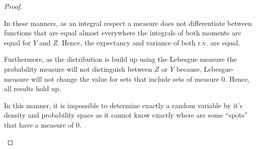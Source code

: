 \documentclass[11pt]{article}
\theoremstyle{definition}
\theoremstyle{remark}
\theoremstyle{remark}
\begin{document}
\begin{proof}
\begin{enumerate}[label=\alph*)]
      In these manners, as an integral respect a measure does not
      differentiate between functions that are equal almost everywhere
      the integrals of both moments are equal for $Y$ and $Z$. Hence,
      the expectancy and variance of both r.v. are equal.

      Furthermore, as the distribution is build up using the Lebesgue
      measure the probability measure will not distinguish between $Z$
      or $Y$ because, Lebesgue-measure will not change the value for
      sets that include sets of measure 0. Hence, all results hold up.

      In this manner, it is impossible to determine exactly a random
      variable by it's density and probability space as it cannot know
      exactly where are some ``spots'' that have a measure of 0.
  \end{enumerate}
\end{proof}
\end{document}
